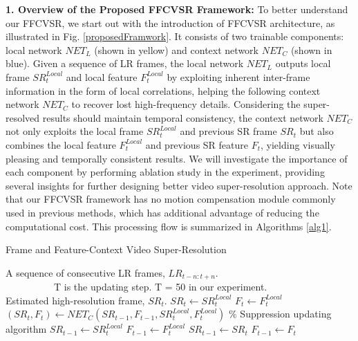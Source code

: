 \documentclass[letterpaper]{article} %
\begin{document}
\textbf{1. Overview of the Proposed FFCVSR Framework:} To better understand our FFCVSR, we start out with the introduction of FFCVSR architecture, as illustrated in Fig. \ref{proposedFramwork}. It consists of two trainable components: local network $NET_L$ (shown in yellow) and context network $NET_C$ (shown in blue). Given a sequence of LR frames, the local network $NET_L$ outputs local frame $SR^{Local}_t$ and local feature $F^{Local}_t$ by exploiting inherent inter-frame information in the form of local correlations, helping the following context network $NET_C$ to recover lost high-frequency details. Considering the super-resolved results should maintain temporal consistency, the context network $NET_C$ not only exploits the local frame $SR^{Local}_t$ and previous SR frame $SR_t$ but also combines the local feature $F^{Local}_t$ and previous SR feature $F_t$, yielding visually pleasing and temporally consistent results. We will investigate the importance of each component by performing ablation study in the experiment, providing several insights for further designing better video super-resolution approach. Note that our FFCVSR framework has no motion compensation module commonly used in previous methods, which has additional advantage of reducing the computational cost. This processing flow is summarized in Algorithms \ref{alg1}.




\begin{algorithm}
\caption{Frame and Feature-Context Video Super-Resolution}
\label{alg1}
\begin{algorithmic}
\REQUIRE A sequence of consecutive LR frames, $LR_{t-n:t+n}$. \\
         ~~~~~~~~~~T is the updating step. T = 50 in our experiment.\\
\ENSURE Estimated high-resolution frame, $SR_t$.
\STATE $SR_t \gets SR^{Local}_t$
\STATE $F_t \gets F^{Local}_t$
\ELSE
\STATE $(SR_t, F_t) \gets NET_C(SR_{t-1}, F_{t-1}, SR^{Local}_t, F^{Local}_t)$
\ENDIF
\ENDFOR
\STATE $\%$ Suppression updating algorithm
\STATE $ SR_{t-1} \gets SR^{Local}_t$
\STATE $ F_{t-1} \gets F^{Local}_t$
\ELSE
\STATE $ SR_{t-1} \gets SR_t$
\STATE $ F_{t-1} \gets F_t$
\ENDIF
\end{algorithmic}
\end{algorithm}
\end{document}
